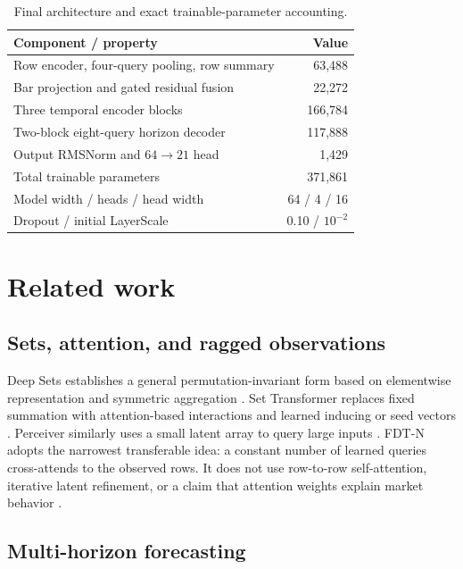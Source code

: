 \documentclass[10pt]{article}
\begin{document}
\begin{table}[H]
\centering
\small
\caption{Final architecture and exact trainable-parameter accounting.}
\label{tab:model-config}
\begin{tabular}{@{}lr@{}}
\toprule
Component / property & Value \\
\midrule
Row encoder, four-query pooling, row summary & 63,488 \\
Bar projection and gated residual fusion & 22,272 \\
Three temporal encoder blocks & 166,784 \\
Two-block eight-query horizon decoder & 117,888 \\
Output RMSNorm and $64\rightarrow21$ head & 1,429 \\
\midrule
Total trainable parameters & 371,861 \\
Model width / heads / head width & 64 / 4 / 16 \\
Dropout / initial LayerScale & 0.10 / $10^{-2}$ \\
\bottomrule
\end{tabular}
\end{table}

\section{Related work}

\subsection{Sets, attention, and ragged observations}

Deep Sets establishes a general permutation-invariant form based on elementwise representation and
symmetric aggregation \citep{zaheer2017deepsets}. Set Transformer replaces fixed summation with
attention-based interactions and learned inducing or seed vectors \citep{lee2019settransformer}.
Perceiver similarly uses a small latent array to query large inputs \citep{jaegle2021perceiver}.
FDT-N adopts the narrowest transferable idea: a constant number of learned queries cross-attends to
the observed rows. It does not use row-to-row self-attention, iterative latent refinement, or a claim
that attention weights explain market behavior \citep{jain2019attention}.

\subsection{Multi-horizon forecasting}
\end{document}
